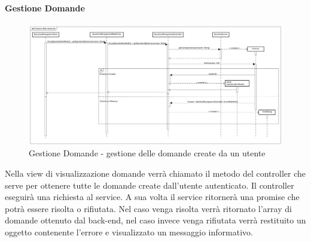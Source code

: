 \paragraph{Gestione Domande}

\label{Gestione Domande - gestione delle domande create da un utente}

\begin{figure}[ht]
	\centering
	\includegraphics[scale=0.25,keepaspectratio]{UML/DiagrammiDiSequenza/Front-end/QuestionsManagement.png}
	\caption{Gestione Domande - gestione delle domande create da un utente}
\end{figure} \FloatBarrier

Nella view di visualizzazione domande verrà chiamato il metodo del controller che serve per ottenere tutte le domande create dall'utente autenticato. Il controller eseguirà una richiesta al service. A sua volta il service ritornerà una promise che potrà essere risolta o rifiutata. Nel caso venga risolta verrà ritornato l'array di domande ottenuto dal back-end, nel caso invece venga rifiutata verrà restituito un oggetto contenente l'errore e visualizzato un messaggio informativo. 